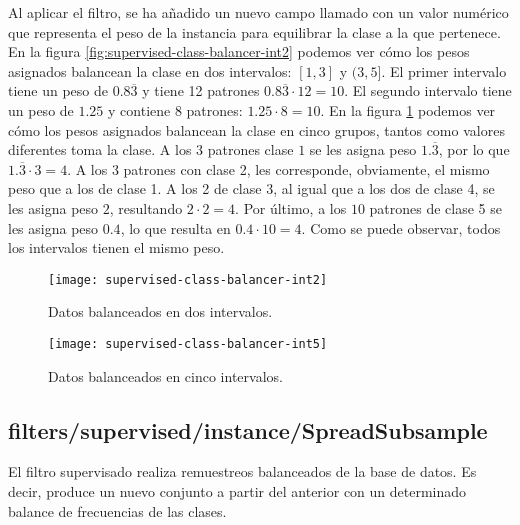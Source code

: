 Al aplicar el filtro, se ha añadido un nuevo campo llamado  con un valor numérico que representa el peso de la instancia para equilibrar la clase a la que pertenece. En la figura \ref{fig:supervised-class-balancer-int2} podemos ver cómo los pesos asignados balancean la clase en dos intervalos: $[1,3]$ y $(3,5]$. El primer intervalo tiene un peso de $0.8\overline{3}$ y tiene 12 patrones $0.8\overline{3}\cdot 12 = 10$. El segundo intervalo tiene un peso de $1.25$ y contiene 8 patrones: $1.25\cdot 8=10$. En la figura \ref{fig:supervised-class-balancer-int5} podemos ver cómo los pesos asignados balancean la clase en cinco grupos, tantos como valores diferentes toma la clase. A los $3$ patrones clase $1$ se les asigna peso $1.\overline{3}$, por lo que $1.\overline{3}\cdot 3 = 4$. A los 3 patrones con clase 2, les corresponde, obviamente, el mismo peso que a los de clase 1. A los 2 de clase 3, al igual que a los dos de clase 4, se les asigna peso $2$, resultando $2\cdot2=4$. Por último, a los $10$ patrones de clase 5 se les asigna peso $0.4$, lo que resulta en $0.4\cdot10=4$. Como se puede observar, todos los intervalos tienen el mismo peso.

\begin{figure}[H]
    \centering
    \begin{minipage}{0.50\textwidth}
        \centering
        \texttt{[image: supervised-class-balancer-int2]}
        \caption{Datos balanceados en dos intervalos.}
        \label{fig:supervised-class-balancer-int2}
    \end{minipage}\hfill
    \begin{minipage}{0.50\textwidth}
        \centering
        \texttt{[image: supervised-class-balancer-int5]}
        \caption{Datos balanceados en cinco intervalos.}
        \label{fig:supervised-class-balancer-int5}
    \end{minipage}
\end{figure}

\subsection{filters/supervised/instance/SpreadSubsample}
El filtro supervisado  realiza remuestreos balanceados de la base de datos. Es decir, produce un nuevo conjunto a partir del anterior con un determinado balance de frecuencias de las clases.

